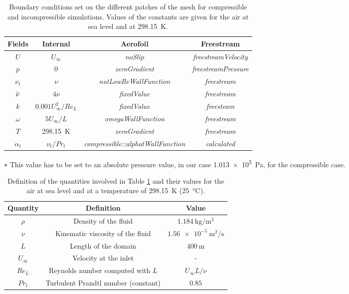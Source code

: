\begin{subappendices}
	\begin{table}
		\centering
		\begin{threeparttable}
			\caption{Boundary conditions set on the different patches of the mesh for compressible and incompressible simulations. Values of the constants are given for the air at sea level and at \SI{298.15}{\kelvin}.}
			\begin{tabular}{cccc}
				\toprule
				Fields & Internal & Aerofoil & Freestream \\
				\midrule
				$U$ & $U_\infty$ & \emph{noSlip} & \emph{freestreamVelocity} \\
				$p$ & 0\tnote{$\star$} & \emph{zeroGradient} & \emph{freestreamPressure} \\
				$\nu_t$ & $\nu$ & \emph{nutLowReWallFunction} & \emph{freestream} \\
				$\Tilde{\nu}$ & $4\nu$ & \emph{fixedValue} & \emph{freestream} \\
				$k$ & $0.001U_\infty^2/Re_L$ & \emph{fixedValue} & \emph{freesteam} \\
				$\omega$ & $5U_\infty/L$ & \emph{omegaWallFunction} & \emph{freestream} \\
				$T$ & \SI{298.15}{\kelvin} & \emph{zeroGradient} & \emph{freestream} \\
				$\alpha_t$ & $\nu_t/Pr_t$ & \emph{compressible::alphatWallFunction} & \emph{calculated} \\
				\bottomrule
			\end{tabular}
			\begin{tablenotes}
				\item [$\star$] This value has to be set to an absolute pressure value, in our case \SI{1.013e5}{\pascal}, for the compressible case.
			\end{tablenotes}
			\label{tab:boundaries}
		\end{threeparttable}
	\end{table}
	
	\begin{table}
		\caption{Definition of the quantities involved in Table \ref{tab:boundaries} and their values for the air at sea level and at a temperature of \SI{298.15}{\kelvin} (\SI{25}{\degreeCelsius}).}
		\centering
		\begin{tabular}{ccc}
			\toprule
			Quantity & Definition & Value \\
			\midrule
			$\rho$ & Density of the fluid & $\SI{1.184}{\kilogram\per\cubic\meter}$ \\
			$\nu$ & Kinematic viscosity of the fluid & $\SI{1.56e-5}{\square\meter\per\second}$ \\
			$L$ & Length of the domain & $\SI{400}{\meter}$ \\
			$U_\infty$ & Velocity at the inlet & - \\
			$Re_L$ & Reynolds number computed with $L$ & $U_\infty L/\nu$ \\
			$Pr_t$ & Turbulent Prandtl number (constant) & $0.85$ \\
			\bottomrule
		\end{tabular}
		\label{tab:bound_quant}
	\end{table}
	

\end{subappendices}
